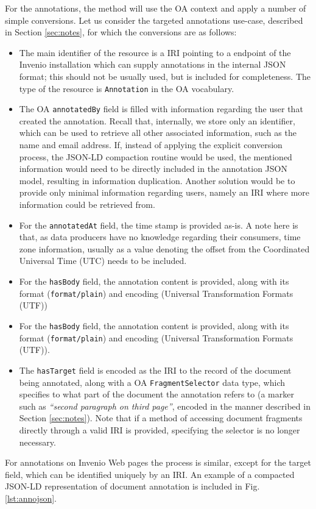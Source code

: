 For the annotations, the method will use the OA context and apply a number of
simple conversions. Let us consider the targeted annotations use-case,
described in Section \ref{sec:notes}, for which the conversions are as follows:
\begin{itemize}
  \item The main identifier of the resource is a IRI pointing to a endpoint of
        the Invenio installation which can supply annotations in the internal
        JSON format; this should not be usually used, but is included for
        completeness. The type of the resource is \texttt{Annotation} in the
        OA vocabulary.
  \item The OA \texttt{annotatedBy} field is filled with information regarding
        the user that created the annotation. Recall that, internally, we store
        only an identifier, which can be used to retrieve all other associated
        information, such as the name and email address. If, instead of applying
        the explicit conversion process, the JSON-LD compaction routine would be
        used, the mentioned information would need to be directly included in
        the annotation JSON model, resulting in information duplication. Another
        solution would be to provide only minimal information regarding users,
        namely an IRI where more information could be retrieved from.
  \item For the \texttt{annotatedAt} field, the time stamp is provided as-is. A
        note here is that, as data producers have no knowledge regarding their
        consumers, time zone information, usually as a value denoting the offset
        from the Coordinated Universal Time (UTC) needs to be included.
  \item For the \texttt{hasBody} field, the annotation content is provided, along
        with its format (\texttt{format/plain}) and encoding (Universal
        Transformation Formats (UTF))
  \item For the \texttt{hasBody} field, the annotation content is provided, along
        with its format (\texttt{format/plain}) and encoding (Universal
        Transformation Formats (UTF)).
  \item The \texttt{hasTarget} field is encoded as the IRI to the record of the
        document being annotated, along with a OA \texttt{FragmentSelector}
        data type, which specifies to what part of the document the annotation
        refers to (a marker such as \textit{``second paragraph on third page''},
        encoded in the manner described in Section \ref{sec:notes}). Note that
        if a method of accessing document fragments directly through a valid
        IRI is provided, specifying the selector is no longer necessary.
\end{itemize}
For annotations on Invenio Web pages the process is similar, except for the
target field, which can be identified uniquely by an IRI. An example of a
compacted JSON-LD representation of document annotation is included in Fig.
\ref{lst:annojson}.

